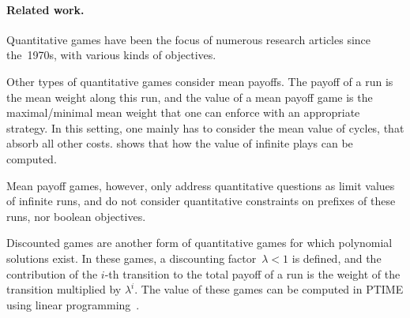 \paragraph{Related work.}
Quantitative games have been the focus of numerous research articles
 since the~1970s, with various kinds of objectives. 



Other types of quantitative games consider mean payoffs. The payoff
of a run is the mean weight along this run, and the value of a
mean payoff game is the maximal/minimal mean weight that one can
enforce with an appropriate strategy. In this setting, one mainly has
to consider the mean value of cycles, that absorb all other
costs. \cite{ZwickP95} shows that how the value of infinite plays can be computed.

Mean payoff games, however, only address quantitative questions as
limit values of infinite runs, and do not consider quantitative
constraints on prefixes of these runs, nor boolean objectives.

Discounted games are another form of quantitative games for which
polynomial solutions exist. In these games, a discounting
factor~$\lambda < 1$ is defined, and the contribution of the $i$-th
transition to the total payoff of a run is the weight of the
transition multiplied by $\lambda^i$. The value of these games can be
computed in PTIME using linear programming~\cite{Andersson06}.



